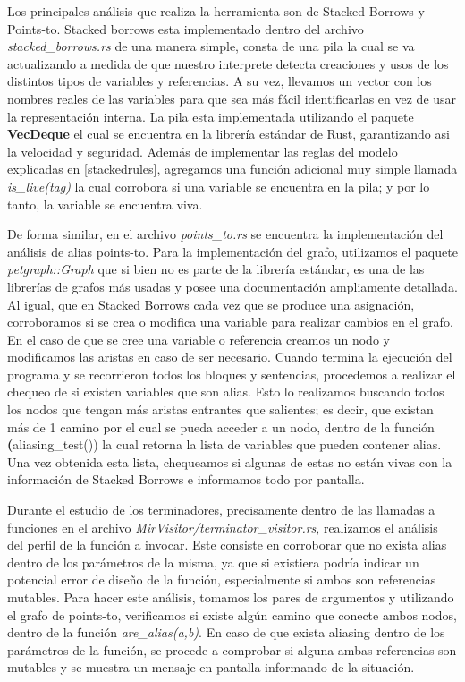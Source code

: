 Los principales análisis que realiza la herramienta son de Stacked Borrows y Points-to. Stacked borrows esta implementado dentro del archivo \textit{stacked\_borrows.rs} de una manera simple, consta de una pila la cual se va actualizando a medida de que nuestro interprete detecta creaciones y usos de los distintos tipos de variables y referencias. A su vez, llevamos un vector con los nombres reales de las variables para que sea más fácil identificarlas en vez de usar la representación interna. La pila esta implementada utilizando el paquete \textbf{VecDeque} el cual se encuentra en la librería estándar de Rust, garantizando asi la velocidad y seguridad. Además de implementar las reglas del modelo explicadas en \ref{stackedrules}, agregamos una función adicional muy simple llamada \textit{is\_live(tag)} la cual corrobora si una variable se encuentra en la pila; y por lo tanto, la variable se encuentra viva.

De forma similar, en el archivo \textit{points\_to.rs} se encuentra la implementación del análisis de alias points-to.
Para la implementación del grafo, utilizamos el paquete \textit{petgraph::Graph} que si bien no es parte de la librería estándar, es una de las librerías de grafos más usadas y posee una documentación ampliamente detallada. Al igual, que en Stacked Borrows cada vez que se produce una asignación, corroboramos si se crea o modifica una variable para realizar cambios en el grafo. En el caso de que se cree una variable o referencia creamos un nodo y modificamos las aristas en caso de ser necesario. Cuando termina la ejecución del programa y se recorrieron todos los bloques y sentencias, procedemos a realizar el chequeo de si existen variables que son alias. Esto lo realizamos buscando todos los nodos que tengan más aristas entrantes que salientes; es decir, que existan más de 1 camino por el cual se pueda acceder a un nodo, dentro de la función \textbf(aliasing\_test()) la cual retorna la lista de variables que pueden contener alias. Una vez obtenida esta lista, chequeamos si algunas de estas no están vivas con la información de Stacked Borrows e informamos todo por pantalla.

Durante el estudio de los terminadores, precisamente dentro de las llamadas a funciones en el archivo \textit{MirVisitor/terminator\_visitor.rs}, realizamos el análisis del perfil de la función a invocar. Este consiste en corroborar que no exista alias dentro de los parámetros de la misma, ya que si existiera podría indicar un potencial error de diseño de la función, especialmente si ambos son referencias mutables. Para hacer este análisis, tomamos los pares de argumentos y utilizando el grafo de points-to, verificamos si existe algún camino que conecte ambos nodos, dentro de la función \textit{are\_alias(a,b)}. En caso de que exista aliasing dentro de los parámetros de la función, se procede a comprobar si alguna ambas referencias son mutables y se muestra un mensaje en pantalla informando de la situación.

